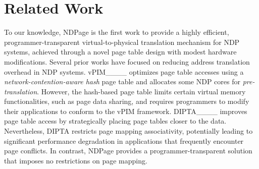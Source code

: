 \section{Related Work}
To our knowledge, NDPage is the first work to provide a highly efficient, programmer-transparent virtual-to-physical translation mechanism for NDP systems, achieved through a novel page table design with modest hardware modifications. 
Several prior works have focused on reducing address translation overhead in NDP systems. 
vPIM____ optimizes page table accesses using a \textit{network-contention-aware hash} page table and allocates some NDP cores for \textit{pre-translation}. 
However, the hash-based page table limits certain virtual memory functionalities, such as page data sharing, and requires programmers to modify their applications to conform to the vPIM framework. 
DIPTA____ improves page table access by strategically placing page tables closer to the data. 
Nevertheless, DIPTA restricts page mapping associativity, potentially leading to significant performance degradation in applications that frequently encounter page conflicts. 
In contrast, NDPage provides a programmer-transparent solution that imposes no restrictions on page mapping.